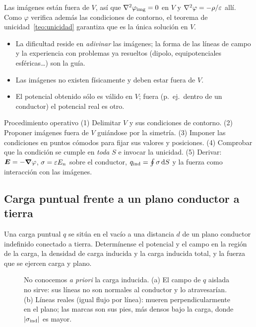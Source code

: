 \documentclass[11pt,a4paper,twoside]{article}
\begin{document}
\begin{demostracion}
Las imágenes están fuera de $V$, así que $\nabla^{2}\varphi_{\mathrm{img}}=0$ en $V$ y
$\nabla^{2}\varphi=-\rho/\varepsilon$ allí. Como $\varphi$ verifica además las condiciones de contorno, el
teorema de unicidad~\ref{teo:unicidad} garantiza que es la única solución en $V$.
\end{demostracion}

\begin{observacion}[Advertencias]
\begin{itemize}
  \item La dificultad reside en \emph{adivinar} las imágenes; la forma de las líneas de
  campo y la experiencia con problemas ya resueltos (dipolo, equipotenciales esféricas\dots)
  son la guía.
  \item Las imágenes no existen físicamente y deben estar fuera de $V$.
  \item El potencial obtenido sólo es válido en $V$; fuera (p.\ ej.\ dentro de un conductor)
  el potencial real es otro.
\end{itemize}
\end{observacion}

\begin{nota}{Procedimiento operativo}
(1) Delimitar $V$ y sus condiciones de contorno. (2) Proponer imágenes fuera de $V$ guiándose
por la simetría. (3) Imponer las condiciones en puntos cómodos para fijar sus valores y
posiciones. (4) Comprobar que la condición se cumple en \emph{toda} $S$ e invocar la
unicidad. (5) Derivar: $\bm{E}=-\bm{\nabla}\varphi$, $\sigma=\varepsilon E_n$ sobre el conductor,
$q_{\mathrm{ind}}=\oint\sigma\,\mathrm{d} S$ y la fuerza como interacción con las imágenes.
\end{nota}

\subsection{Carga puntual frente a un plano conductor a tierra}

\begin{problema}\label{prob:plano}
Una carga puntual $q$ se sitúa en el vacío a una distancia $d$ de un plano conductor
indefinido conectado a tierra. Determínense el potencial y el campo en la región de la carga,
la densidad de carga inducida y la carga inducida total, y la fuerza que se ejercen carga y
plano.
\end{problema}

\begin{figure}[!htb]
  \centering
  
  \caption{No conocemos \emph{a priori} la carga inducida. (a) El campo de $q$ aislada no
  sirve: sus líneas no son normales al conductor y lo atravesarían. (b) Líneas reales
  (igual flujo por línea): mueren perpendicularmente en el plano; las marcas son sus pies,
  más densos bajo la carga, donde $\left\lvert \sigma_{\mathrm{ind}}\right\rvert$ es mayor.}
  \label{fig:plano-lineas}
\end{figure}
\end{document}
